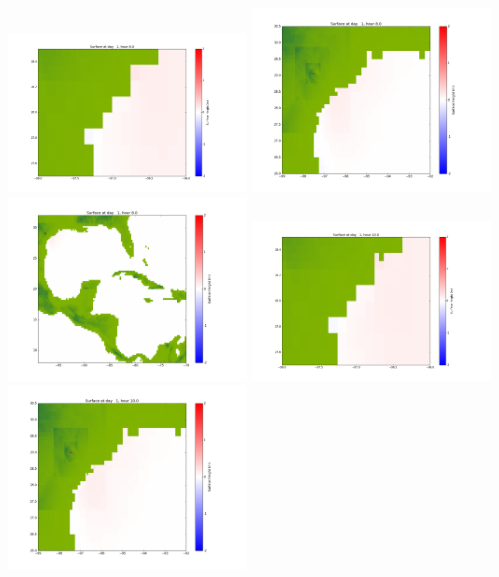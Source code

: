 \documentclass[11pt]{article}
\begin{document}
\vskip 10pt 
\includegraphics[width=0.475\textwidth]{frame0040fig1001.png}
\includegraphics[width=0.475\textwidth]{frame0040fig1002.png}
\vskip 10pt 
\includegraphics[width=0.475\textwidth]{frame0040fig1003.png}
\vskip 10pt 
\includegraphics[width=0.475\textwidth]{frame0041fig1001.png}
\includegraphics[width=0.475\textwidth]{frame0041fig1002.png}
\end{document}
